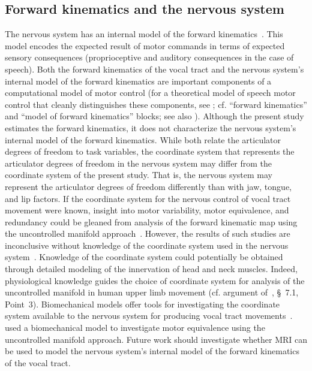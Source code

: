 \documentclass[preprint]{JASAnew}\usepackage[]{graphicx}\usepackage[]{color}
\begin{document}
\subsection{Forward kinematics and the nervous system}

The nervous system has an internal model of the forward kinematics~\citep{shadmehr2010error, guenther2016neural}. This model encodes the expected result of motor commands in terms of expected sensory consequences (proprioceptive and auditory consequences in the case of speech). 
%
Both the forward kinematics of the vocal tract and the nervous system's internal model of the forward kinematics are important components of a computational model of motor control  (for a theoretical model of speech motor control that cleanly distinguishes these components, see \citealt{Ramanarayanan+2016}; cf. ``forward kinematics'' and ``model of forward kinematics'' blocks; see also \citealt{houde2011speech,todorov2002optimal}). Although the present study estimates the forward kinematics, it does not characterize the nervous system's internal model of the forward kinematics. While both relate the articulator degrees of freedom to task variables, the coordinate system that represents the articulator degrees of freedom in the nervous system may differ from the coordinate system of the present study. That is, the nervous system may represent the articulator degrees of freedom differently than with jaw, tongue, and lip factors. If the coordinate system for the nervous control of vocal tract movement were known, insight into motor variability, motor equivalence, and redundancy could be gleaned from analysis of the forward kinematic map using the uncontrolled manifold approach~\cite{scholz1999uncontrolled}. However, the results of such studies are inconclusive without knowledge of the coordinate system used in the nervous system~\cite{sternad2010coordinate}. Knowledge of the coordinate system could potentially be obtained through detailed modeling of the innervation of head and neck muscles. Indeed, physiological knowledge guides the choice of coordinate system for analysis of the uncontrolled manifold in human upper limb movement (cf. argument of~\citealt{scholz2014use}, \S~7.1, Point~3).
Biomechanical models offer tools for investigating the coordinate system available to the nervous system for producing vocal tract movements~\cite{lloyd2012artisynth}. \citet{Szabados+2016} used a biomechanical model to investigate motor equivalence using the uncontrolled manifold approach. Future work should investigate whether MRI can be used to model the nervous system's internal model of the forward kinematics of the vocal tract. 
\end{document}
